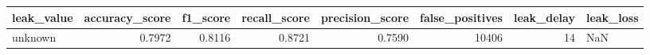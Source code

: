 \begin{tabular}{lrrrrrrl}
\toprule
leak\_value & accuracy\_score & f1\_score & recall\_score & precision\_score & false\_positives & leak\_delay & leak\_loss \\
\midrule
unknown & 0.7972 & 0.8116 & 0.8721 & 0.7590 & 10406 & 14 & NaN \\
\bottomrule
\end{tabular}
